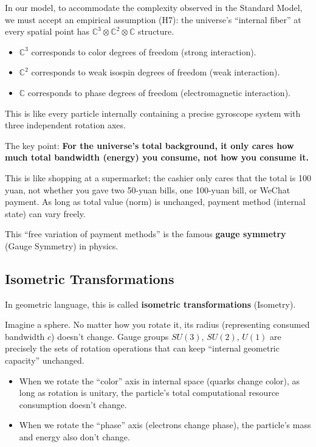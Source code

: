 \documentclass[11pt,a4paper,twoside]{book}
\begin{document}
In our model, to accommodate the complexity observed in the Standard Model, we must accept an empirical assumption (H7): the universe's ``internal fiber'' at every spatial point has $\mathbb{C}^3 \otimes \mathbb{C}^2 \otimes \mathbb{C}$ structure.

\begin{itemize}
\item $\mathbb{C}^3$ corresponds to color degrees of freedom (strong interaction).

\item $\mathbb{C}^2$ corresponds to weak isospin degrees of freedom (weak interaction).

\item $\mathbb{C}$ corresponds to phase degrees of freedom (electromagnetic interaction).
\end{itemize}

This is like every particle internally containing a precise gyroscope system with three independent rotation axes.

The key point: \textbf{For the universe's total background, it only cares how much total bandwidth (energy) you consume, not how you consume it.}

This is like shopping at a supermarket; the cashier only cares that the total is 100 yuan, not whether you gave two 50-yuan bills, one 100-yuan bill, or WeChat payment. As long as total value (norm) is unchanged, payment method (internal state) can vary freely.

This ``free variation of payment methods'' is the famous \textbf{gauge symmetry} (Gauge Symmetry) in physics.

\subsection{Isometric Transformations}

In geometric language, this is called \textbf{isometric transformations} (Isometry).

Imagine a sphere. No matter how you rotate it, its radius (representing consumed bandwidth $c$) doesn't change. Gauge groups $SU(3)$, $SU(2)$, $U(1)$ are precisely the sets of rotation operations that can keep ``internal geometric capacity'' unchanged.

\begin{itemize}
\item When we rotate the ``color'' axis in internal space (quarks change color), as long as rotation is unitary, the particle's total computational resource consumption doesn't change.

\item When we rotate the ``phase'' axis (electrons change phase), the particle's mass and energy also don't change.
\end{itemize}
\end{document}
